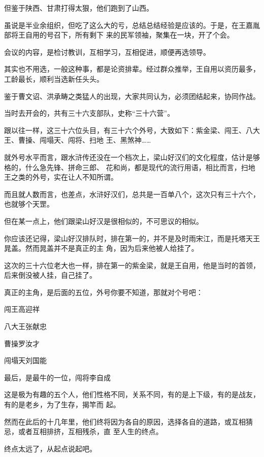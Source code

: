 \documentclass[11pt,a4paper,onecolumn]{article}
\begin{document}
但鉴于陕西、甘肃打得太狠，他们跑到了山西。

虽说是半业余组织，但吃了这么大的亏，总结总结经验是应该的。于是，在王嘉胤部将王自用的号召下，所有剩下
来的民军领袖，聚集在一块，开了个会。

会议的内容，是检讨教训，互相学习，互相促进，顺便再选领导。

其实也不用选，一般这种事，都是论资排辈。经过群众推举，王自用以资历最多，工龄最长，顺利当选新任头头。

鉴于曹文诏、洪承畴之类猛人的出现，大家共同认为，必须团结起来，协同作战。

当时去开会的，共有三十六支部队，史称``三十六营''。

跟以往一样，这三十六位头目，有三十六个外号，大致如下：紫金梁、闯王、八大王、曹操、闯塌天、闯将、扫地
王、黑煞神……

就外号水平而言，跟水浒传还没在一个档次上，梁山好汉们的文化程度，估计是够格的，什么急先锋、拼命三郎、
花和尚，都是现代的流行用语，相比而言，扫地王之类的外号，实在让人不知所谓。

而且就人数而言，也差点，水浒好汉们，总共是一百单八个，这次只有三十六个，也就够个天罡。

但在某一点上，他们跟梁山好汉是很相似的，不可思议的相似。

你应该还记得，梁山好汉排队时，排在第一的，并不是及时雨宋江，而是托塔天王晁盖。然而晁盖并不是真正的主
角，因为后来他被人给挂了。

这次的三十六位老大也一样，排在第一的紫金梁，就是王自用，他是当时的首领，后来倒没被人挂，自己挂了。

真正的主角，是后面的五位，外号你要不知道，那就对个号吧：

闯王\myrule 高迎祥

八大王\myrule 张献忠

曹操\myrule 罗汝才

闯塌天\myrule 刘国能

最后，是最牛的一位，闯将\myrule 李自成

这是极为有趣的五个人，他们性格不同，关系不同，有的是上下级，有的是战友，有的是老乡，为了生存，揭竿而
起。

然而在此后的十几年里，他们终将因为各自的原因，选择各自的道路，或互相猜忌，或者互相排挤，互相残杀，直
至人生的终点。

终点太远了，从起点说起吧。

\section[\thesection]{}
\end{document}
